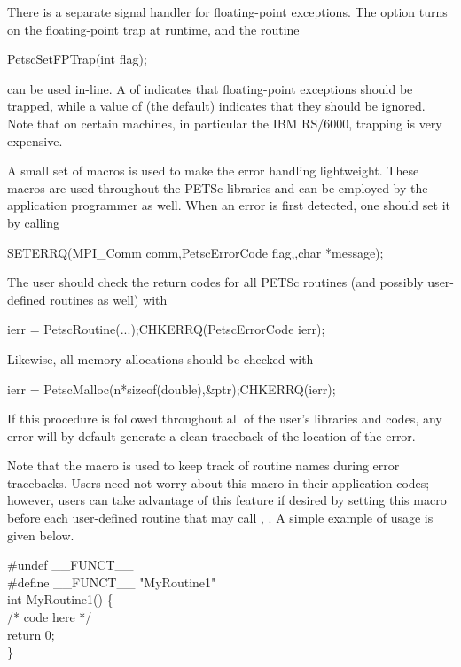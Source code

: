 {{{There is a separate signal handler for floating-point exceptions.
 
The option  turns on the floating-point trap at runtime,
and the routine  
\begin{tabbing}
  PetscSetFPTrap(int flag);
\end{tabbing}
can be used in-line.
A  of  
indicates that floating-point exceptions should be trapped,
while a value of  (the default) indicates that they
should be ignored.  Note that on certain machines, in particular
the IBM RS/6000, trapping is very expensive.

A small set of macros is used to make the error handling lightweight.
These macros are used throughout the PETSc libraries and can be employed
by the application   
programmer as well.  When an error is first detected,
one should set it by calling
\begin{tabbing}
   SETERRQ(MPI\_Comm comm,PetscErrorCode flag,,char *message);
\end{tabbing}
The user should check the return codes for all PETSc routines (and
possibly user-defined routines as well) with
\begin{tabbing}
  ierr = PetscRoutine(...);CHKERRQ(PetscErrorCode ierr);
\end{tabbing}
Likewise, all memory allocations should be checked with
\begin{tabbing}
  ierr = PetscMalloc(n*sizeof(double),\&ptr);CHKERRQ(ierr);
\end{tabbing}
If this procedure is followed throughout all of the user's libraries
and codes, any error will by default generate a clean traceback of
the location  
of the error.

Note that the macro  is used to keep track of
routine names during error tracebacks.  Users need not worry about this
macro in their application codes; however, users can take advantage of this feature
if desired by setting this macro before each user-defined routine
that may call , .
A simple example of usage is given below.
\begin{tabbing}
    \#undef \_\_FUNCT\_\_  \\
    \#define \_\_FUNCT\_\_ "MyRoutine1"\\
    int MyRoutine1() \{ \\
        /* code here */\\
        return 0;\\
    \}
\end{tabbing}

}}}
